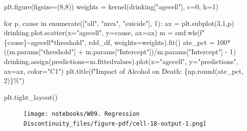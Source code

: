 \documentclass[
  letterpaper,
  DIV=11,
  numbers=noendperiod]{scrreprt}
\newenvironment{Shaded}{\begin{snugshade}}{\end{snugshade}}
\newcommand{\BuiltInTok}[1]{\textcolor[rgb]{0.00,0.23,0.31}{#1}}
\newcommand{\ControlFlowTok}[1]{\textcolor[rgb]{0.00,0.23,0.31}{#1}}
\newcommand{\DecValTok}[1]{\textcolor[rgb]{0.68,0.00,0.00}{#1}}
\newcommand{\KeywordTok}[1]{\textcolor[rgb]{0.00,0.23,0.31}{#1}}
\newcommand{\NormalTok}[1]{\textcolor[rgb]{0.00,0.23,0.31}{#1}}
\newcommand{\OperatorTok}[1]{\textcolor[rgb]{0.37,0.37,0.37}{#1}}
\newcommand{\SpecialCharTok}[1]{\textcolor[rgb]{0.37,0.37,0.37}{#1}}
\newcommand{\SpecialStringTok}[1]{\textcolor[rgb]{0.13,0.47,0.30}{#1}}
\newcommand{\StringTok}[1]{\textcolor[rgb]{0.13,0.47,0.30}{#1}}
\begin{document}
\begin{Shaded}
\begin{Highlighting}[]
\NormalTok{plt.figure(figsize}\OperatorTok{=}\NormalTok{(}\DecValTok{8}\NormalTok{,}\DecValTok{8}\NormalTok{))}
\NormalTok{weights }\OperatorTok{=}\NormalTok{ kernel(drinking[}\StringTok{"agecell"}\NormalTok{], c}\OperatorTok{=}\DecValTok{0}\NormalTok{, h}\OperatorTok{=}\DecValTok{1}\NormalTok{)}

\ControlFlowTok{for}\NormalTok{ p, cause }\KeywordTok{in} \BuiltInTok{enumerate}\NormalTok{([}\StringTok{"all"}\NormalTok{, }\StringTok{"mva"}\NormalTok{, }\StringTok{"suicide"}\NormalTok{], }\DecValTok{1}\NormalTok{):}
\NormalTok{    ax }\OperatorTok{=}\NormalTok{ plt.subplot(}\DecValTok{3}\NormalTok{,}\DecValTok{1}\NormalTok{,p)}
\NormalTok{    drinking.plot.scatter(x}\OperatorTok{=}\StringTok{"agecell"}\NormalTok{, y}\OperatorTok{=}\NormalTok{cause, ax}\OperatorTok{=}\NormalTok{ax)}
\NormalTok{    m }\OperatorTok{=}\NormalTok{ smf.wls(}\SpecialStringTok{f"}\SpecialCharTok{\{}\NormalTok{cause}\SpecialCharTok{\}}\SpecialStringTok{\textasciitilde{}agecell*threshold"}\NormalTok{, rdd\_df, weights}\OperatorTok{=}\NormalTok{weights).fit()}
\NormalTok{    ate\_pct }\OperatorTok{=} \DecValTok{100}\OperatorTok{*}\NormalTok{((m.params[}\StringTok{"threshold"}\NormalTok{] }\OperatorTok{+}\NormalTok{ m.params[}\StringTok{"Intercept"}\NormalTok{])}\OperatorTok{/}\NormalTok{m.params[}\StringTok{"Intercept"}\NormalTok{] }\OperatorTok{{-}} \DecValTok{1}\NormalTok{)}
\NormalTok{    drinking.assign(predictions}\OperatorTok{=}\NormalTok{m.fittedvalues).plot(x}\OperatorTok{=}\StringTok{"agecell"}\NormalTok{, y}\OperatorTok{=}\StringTok{"predictions"}\NormalTok{, ax}\OperatorTok{=}\NormalTok{ax, color}\OperatorTok{=}\StringTok{"C1"}\NormalTok{)}
\NormalTok{    plt.title(}\SpecialStringTok{f"Impact of Alcohol on Death: }\SpecialCharTok{\{}\NormalTok{np}\SpecialCharTok{.}\BuiltInTok{round}\NormalTok{(ate\_pct, }\DecValTok{2}\NormalTok{)}\SpecialCharTok{\}}\SpecialStringTok{\%"}\NormalTok{)}

\NormalTok{plt.tight\_layout()}
\end{Highlighting}
\end{Shaded}

\begin{figure}[H]

{\centering \texttt{[image: notebooks/W09. Regression Discontinuity\_files/figure-pdf/cell-18-output-1.png]}

}

\end{figure}
\end{document}
